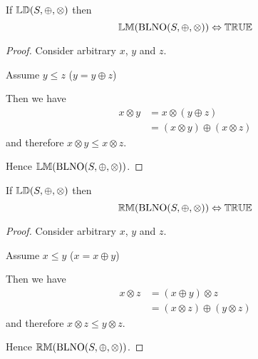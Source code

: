 
\begin{theorem} \label{thm:blno_left_monotonic}
If ${\mathbb{LD}}(S, \oplus, \otimes)$ then
\begin{equation*}
{\mathbb{LM}}(\mathrm{BLNO}(S,\oplus,\otimes)) \Leftrightarrow {\mathbb{TRUE}}
\end{equation*}
\end{theorem}

\begin{proof}

\vspace{0.5em}
Consider arbitrary $x$, $y$ and $z$.
\begin{ind}
Assume $y \leq z$ ($y = y \oplus z$)
\begin{ind}
Then we have
\begin{align*}
x \otimes y & = x \otimes (y \oplus z) \\
			& = (x \otimes y) \oplus (x \otimes z)
\end{align*}
and therefore $x \otimes y \leq x \otimes z$.
\end{ind}
\end{ind}
Hence ${\mathbb{LM}}(\mathrm{BLNO}(S,\oplus,\otimes))$.
\end{proof}






\begin{theorem} \label{thm:brno_left_monotonic}
If ${\mathbb{LD}}(S, \oplus, \otimes)$ then
\begin{equation*}
{\mathbb{RM}}(\mathrm{BLNO}(S,\oplus,\otimes)) \Leftrightarrow {\mathbb{TRUE}}
\end{equation*}
\end{theorem}

\begin{proof}

\vspace{0.5em}
Consider arbitrary $x$, $y$ and $z$.
\begin{ind}
Assume $x \leq y$ ($x = x \oplus y$)
\begin{ind}
Then we have
\begin{align*}
x \otimes z & = (x \oplus y) \otimes z \\
			& = (x \otimes z) \oplus (y \otimes z)
\end{align*}
and therefore $x \otimes z \leq y \otimes z$.
\end{ind}
\end{ind}
Hence ${\mathbb{RM}}(\mathrm{BLNO}(S,\oplus,\otimes))$.
\end{proof}





